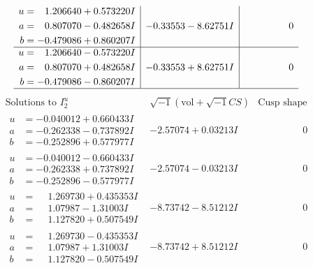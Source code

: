\documentclass[1p]{elsarticle_modified}
\theoremstyle{definition}
\newcommand{\I}{\sqrt{-1}}
\begin{document}
$$\begin{array}{c|c|c}
\begin{aligned}
u &= \phantom{-}1.206640 + 0.573220 I \\
a &= \phantom{-}0.807070 - 0.482658 I \\
b &= -0.479086 + 0.860207 I\end{aligned}
 & -0.33553 - 8.62751 I & \phantom{-0.000000 } 0 \\ \hline\begin{aligned}
u &= \phantom{-}1.206640 - 0.573220 I \\
a &= \phantom{-}0.807070 + 0.482658 I \\
b &= -0.479086 - 0.860207 I\end{aligned}
 & -0.33553 + 8.62751 I & \phantom{-0.000000 } 0\\
 \hline 
 \end{array}$$\newpage$$\begin{array}{c|c|c}  
\text{Solutions to }I^u_{2}& \I (\text{vol} + \sqrt{-1}CS) & \text{Cusp shape}\\
 \hline 
\begin{aligned}
u &= -0.040012 + 0.660433 I \\
a &= -0.262338 - 0.737892 I \\
b &= -0.252896 + 0.577977 I\end{aligned}
 & -2.57074 + 0.03213 I & \phantom{-0.000000 } 0 \\ \hline\begin{aligned}
u &= -0.040012 - 0.660433 I \\
a &= -0.262338 + 0.737892 I \\
b &= -0.252896 - 0.577977 I\end{aligned}
 & -2.57074 - 0.03213 I & \phantom{-0.000000 } 0 \\ \hline\begin{aligned}
u &= \phantom{-}1.269730 + 0.435353 I \\
a &= \phantom{-}1.07987 - 1.31003 I \\
b &= \phantom{-}1.127820 + 0.507549 I\end{aligned}
 & -8.73742 - 8.51212 I & \phantom{-0.000000 } 0 \\ \hline\begin{aligned}
u &= \phantom{-}1.269730 - 0.435353 I \\
a &= \phantom{-}1.07987 + 1.31003 I \\
b &= \phantom{-}1.127820 - 0.507549 I\end{aligned}
 & -8.73742 + 8.51212 I & \phantom{-0.000000 } 0 \\ \hline\begin{aligned}

\end{aligned}
\end{array}$$
\end{document}
